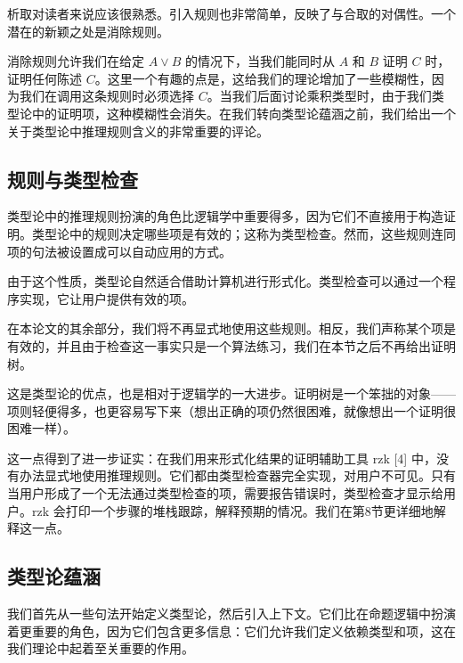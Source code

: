 \documentclass{ctexrep}
\theoremstyle{plain}
\theoremstyle{definition}
\theoremstyle{remark}
\theoremstyle{definition}
\theoremstyle{definition}
\theoremstyle{definition}
\begin{document}
析取对读者来说应该很熟悉。引入规则也非常简单，反映了与合取的对偶性。一个潜在的新颖之处是消除规则。
消除规则允许我们在给定 $A\lor B$ 的情况下，当我们能同时从 $A$ 和 $B$ 证明 $C$ 时，证明任何陈述 $C$。这里一个有趣的点是，这给我们的理论增加了一些模糊性，因为我们在调用这条规则时必须选择 $C$。当我们后面讨论乘积类型时，由于我们类型论中的证明项，这种模糊性会消失。在我们转向类型论蕴涵之前，我们给出一个关于类型论中推理规则含义的非常重要的评论。

\subsection{规则与类型检查}

类型论中的推理规则扮演的角色比逻辑学中重要得多，因为它们不直接用于构造证明。类型论中的规则决定哪些项是有效的；这称为类型检查。然而，这些规则连同项的句法被设置成可以自动应用的方式。

由于这个性质，类型论自然适合借助计算机进行形式化。类型检查可以通过一个程序实现，它让用户提供有效的项。

在本论文的其余部分，我们将不再显式地使用这些规则。相反，我们声称某个项是有效的，并且由于检查这一事实只是一个算法练习，我们在本节之后不再给出证明树。

这是类型论的优点，也是相对于逻辑学的一大进步。证明树是一个笨拙的对象——项则轻便得多，也更容易写下来（想出正确的项仍然很困难，就像想出一个证明很困难一样）。

这一点得到了进一步证实：在我们用来形式化结果的证明辅助工具 \textsf{rzk} [4] 中，没有办法显式地使用推理规则。它们都由类型检查器完全实现，对用户不可见。只有当用户形成了一个无法通过类型检查的项，需要报告错误时，类型检查才显示给用户。\textsf{rzk} 会打印一个步骤的堆栈跟踪，解释预期的情况。我们在第8节更详细地解释这一点。

\subsection{类型论蕴涵}

我们首先从一些句法开始定义类型论，然后引入上下文。它们比在命题逻辑中扮演着更重要的角色，因为它们包含更多信息：它们允许我们定义依赖类型和项，这在我们理论中起着至关重要的作用。
\end{document}
